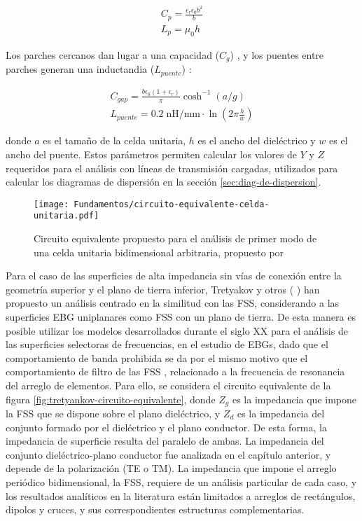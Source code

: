 \begin{align}
	\label{eq:Cp_Lp}
	C_p = \frac{\epsilon_r \epsilon_0 b^2}{b} \\
	L_p = \mu_0 h
\end{align}

Los parches cercanos dan lugar a una capacidad ($C_g$) \cite{Marcela:Tesis} \cite{Sievenpiper:Thesis} \cite{KimSchuttAine:AnalysisHybrid}, y los puentes entre parches generan una inductandia ($L_{puente}$) \cite{KimSchuttAine:AnalysisHybrid}:

\begin{align}
	\label{eq:cgap-y-lgap}
	C_{gap} = \frac{b \epsilon_0 (1+\epsilon_r)}{\pi} \cosh^{-1} (a / g) \\
	L_{puente} = 0.2\; \text{nH/mm} \cdot \ln (2\pi \frac{h}{w})
\end{align}

donde $a$ es el tamaño de la celda unitaria, $h$ es el ancho del dieléctrico y $w$ es el ancho del puente. Estos parámetros permiten calcular los valores de $Y$ y $Z$ requeridos para el análisis con líneas de transmisión cargadas, utilizados para calcular los diagramas de dispersión en la sección \ref{sec:diag-de-dispersion}.


\begin{figure}[h]
	\centering
	\texttt{[image: Fundamentos/circuito-equivalente-celda-unitaria.pdf]}
	\caption{Circuito equivalente propuesto para el análisis de primer modo de una celda unitaria bidimensional arbitraria, propuesto por \cite{KimSchuttAine:AnalysisHybrid}}
	\label{fig:circuito-equivalente-kim-parches}
\end{figure}

Para el caso de las superficies de alta impedancia sin vías de conexión entre la geometría superior y el plano de tierra inferior, Tretyakov y otros (\cite{Tretyakov:AnalyticalModeling} \cite{Yakovlev:AnalyticalModelingHIS}) han propuesto un análisis centrado en la similitud con las FSS, considerando a las superficies EBG uniplanares como FSS con un plano de tierra. De esta manera es posible utilizar los modelos desarrollados durante el siglo \textsc{XX} para el análisis de las superficies selectoras de frecuencias, en el estudio de EBGs, dado que el comportamiento de banda prohibida se da por el mismo motivo que el comportamiento de filtro de las FSS \cite{Goussetis:TailoringAMCEBGCharacteristics}, relacionado a la frecuencia de resonancia del arreglo de elementos. Para ello, se considera el circuito equivalente de la figura \ref{fig:tretyankov-circuito-equivalente}, donde $Z_g$ es la impedancia que impone la FSS que se dispone sobre el plano dieléctrico, y $Z_d$ es la impedancia del conjunto formado por el dieléctrico y el plano conductor. De esta forma, la impedancia de superficie resulta del paralelo de ambas. La impedancia del conjunto dieléctrico-plano conductor fue analizada en el capítulo anterior, y depende de la polarización (TE o TM). La impedancia que impone el arreglo periódico bidimensional, la FSS, requiere de un análisis particular de cada caso, y los resultados analíticos en la literatura están limitados a arreglos de rectángulos, dipolos y cruces, y sus correspondientes estructuras complementarias.


